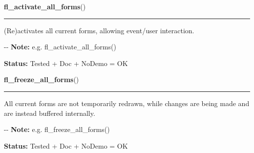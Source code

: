     \label{xformslib:flbasic:fl_activate_all_forms}

    \vspace{0.5ex}

\hspace{.8\funcindent}\begin{boxedminipage}{\funcwidth}

    \raggedright \textbf{fl\_activate\_all\_forms}()

    \vspace{-1.5ex}

    \rule{\textwidth}{0.5\fboxrule}
\setlength{\parskip}{2ex}

(Re)activates all current forms, allowing event/user interaction.

-{}-
\setlength{\parskip}{1ex}
\textbf{Note:} 
e.g. fl\_activate\_all\_forms()


\textbf{Status:} 
Tested + Doc + NoDemo = OK


    \end{boxedminipage}

    \label{xformslib:flbasic:fl_freeze_all_forms}

    \vspace{0.5ex}

\hspace{.8\funcindent}\begin{boxedminipage}{\funcwidth}

    \raggedright \textbf{fl\_freeze\_all\_forms}()

    \vspace{-1.5ex}

    \rule{\textwidth}{0.5\fboxrule}
\setlength{\parskip}{2ex}

All current forms are not temporarily redrawn, while changes are being
made and are instead buffered internally.

-{}-
\setlength{\parskip}{1ex}
\textbf{Note:} 
e.g. fl\_freeze\_all\_forms()


\textbf{Status:} 
Tested + Doc + NoDemo = OK


    \end{boxedminipage}

    \label{xformslib:flbasic:fl_unfreeze_all_forms}

